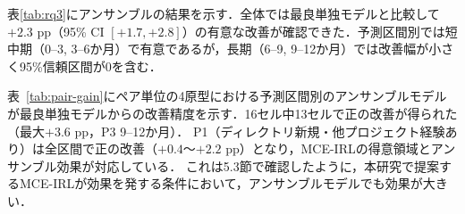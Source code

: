 \documentclass[submit,noauthor,ses,dvipdfmx]{ipsj}
\newcommand{\todo}[1]{\colorbox{yellow}{{\bf TODO}:}{\color{red} {\textbf{[#1]}}}}
\begin{document}
表\ref{tab:rq3}にアンサンブルの結果を示す．全体では最良単独モデルと比較して$+2.3$ pp（95\% CI $[+1.7, +2.8]$）の有意な改善が確認できた．予測区間別では短中期（0--3, 3--6か月）で有意であるが，長期（6--9, 9--12か月）では改善幅が小さく95\%信頼区間が0を含む．

表~\ref{tab:pair-gain}にペア単位の4原型における予測区間別のアンサンブルモデルが最良単独モデルからの改善精度を示す．16セル中13セルで正の改善が得られた（最大$+3.6$ pp，P3 9--12か月）．
P1（ディレクトリ新規・他プロジェクト経験あり）は全区間で正の改善（$+0.4$〜$+2.2$ pp）となり，MCE-IRLの得意領域とアンサンブル効果が対応している．
これは5.3節で確認したように，本研究で提案するMCE-IRLが効果を発する条件において，アンサンブルモデルでも効果が大きい．



\end{document}

